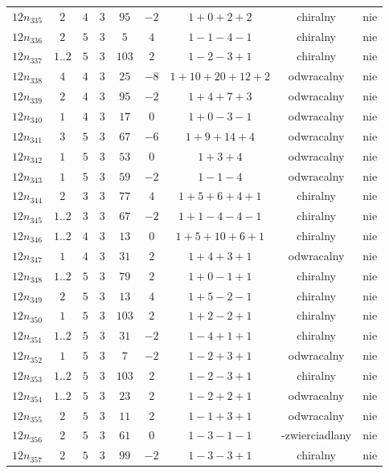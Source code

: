 \begin{longtable}{ccccccccc}
$12n_{335}$ & $2$ & $4$ & $3$ & $95$ & $-2$ & $1+0+2+2$ & chiralny & nie \\
$12n_{336}$ & $2$ & $5$ & $3$ & $5$ & $4$ & $1-1-4-1$ & chiralny & nie \\
$12n_{337}$ & $1..2$ & $5$ & $3$ & $103$ & $2$ & $1-2-3+1$ & chiralny & nie \\
$12n_{338}$ & $4$ & $4$ & $3$ & $25$ & $-8$ & $1+10+20+12+2$ & odwracalny & nie \\
$12n_{339}$ & $2$ & $4$ & $3$ & $95$ & $-2$ & $1+4+7+3$ & odwracalny & nie \\
$12n_{340}$ & $1$ & $4$ & $3$ & $17$ & $0$ & $1+0-3-1$ & odwracalny & nie \\
$12n_{341}$ & $3$ & $5$ & $3$ & $67$ & $-6$ & $1+9+14+4$ & odwracalny & nie \\
$12n_{342}$ & $1$ & $5$ & $3$ & $53$ & $0$ & $1+3+4$ & odwracalny & nie \\
$12n_{343}$ & $1$ & $5$ & $3$ & $59$ & $-2$ & $1-1-4$ & odwracalny & nie \\
$12n_{344}$ & $2$ & $3$ & $3$ & $77$ & $4$ & $1+5+6+4+1$ & chiralny & nie \\
$12n_{345}$ & $1..2$ & $3$ & $3$ & $67$ & $-2$ & $1+1-4-4-1$ & chiralny & nie \\
$12n_{346}$ & $1..2$ & $4$ & $3$ & $13$ & $0$ & $1+5+10+6+1$ & chiralny & nie \\
$12n_{347}$ & $1$ & $4$ & $3$ & $31$ & $2$ & $1+4+3+1$ & odwracalny & nie \\
$12n_{348}$ & $1..2$ & $5$ & $3$ & $79$ & $2$ & $1+0-1+1$ & chiralny & nie \\
$12n_{349}$ & $2$ & $5$ & $3$ & $13$ & $4$ & $1+5-2-1$ & chiralny & nie \\
$12n_{350}$ & $1$ & $5$ & $3$ & $103$ & $2$ & $1+2-2+1$ & chiralny & nie \\
$12n_{351}$ & $1..2$ & $5$ & $3$ & $31$ & $-2$ & $1-4+1+1$ & chiralny & nie \\
$12n_{352}$ & $1$ & $5$ & $3$ & $7$ & $-2$ & $1-2+3+1$ & odwracalny & nie \\
$12n_{353}$ & $1..2$ & $5$ & $3$ & $103$ & $2$ & $1-2-3+1$ & chiralny & nie \\
$12n_{354}$ & $1..2$ & $5$ & $3$ & $23$ & $2$ & $1-2+2+1$ & odwracalny & nie \\
$12n_{355}$ & $2$ & $5$ & $3$ & $11$ & $2$ & $1-1+3+1$ & odwracalny & nie \\
$12n_{356}$ & $2$ & $5$ & $3$ & $61$ & $0$ & $1-3-1-1$ & -zwierciadlany & nie \\
$12n_{357}$ & $2$ & $5$ & $3$ & $99$ & $-2$ & $1-3-3+1$ & chiralny & nie \\

\end{longtable}

